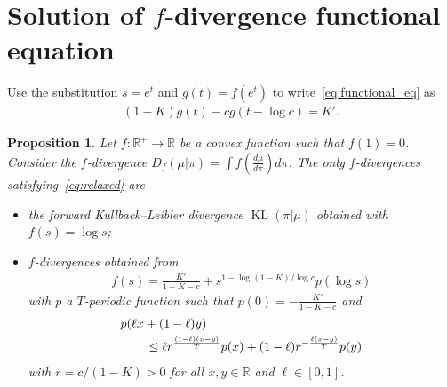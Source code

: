 \documentclass[10pt,a4paper]{amsart}
\newtheorem{proposition}{Proposition}
\newcommand{\KL}{\mathop{\mathrm{KL}}\nolimits}
\newcommand{\R}{\mathbb R}
\begin{document}
\section{Solution of $f$-divergence functional equation}
\label{sec:functional_eq}
Use the substitution $s=e^t$ and $g(t)=f(e^t)$ to write~\eqref{eq:functional_eq} as
\begin{align*}
(1-K) g(t) - cg(t-\log c) = K'.
\end{align*}

\begin{proposition}
\label{prop:fdiv}
Let $f:
\R^+\to \R$ be a convex function such that $f(1)=0$. Consider the $f$-divergence
$D_f(\mu | \pi)= \int f\left(\frac{d\mu}{d\pi}\right) d\pi$.
The only $f$-divergences satisfying~\eqref{eq:relaxed} are
\begin{itemize}
    \item the forward Kullback--Leibler divergence $\KL(\pi|\mu)$ obtained with $f(s) = \log s$;
    \item $f$-divergences obtained from 
    \begin{align*}
    f(s)= \frac{K'}{1-K-c} + s^{1-\log (1-K)/\log c} p(\log s)
\end{align*}
with $p$ a $T$-periodic function such that $p(0) = -\frac{K'}{1-K-c}$ and
\begin{align}
\label{eq:p_condition}
&p(\ell x+(1-\ell)y)\\
&\qquad\le
\ell r^{\frac{(1-\ell)(x-y)}{T}}p(x)
+
(1-\ell)r^{-\frac{\ell(x-y)}{T}}p(y)\notag
\end{align}
with $r=c/(1-K)>0$ for all $x, y\in\R$ and $\ell\in[0, 1]$.
\end{itemize}
\end{proposition}
\end{document}
